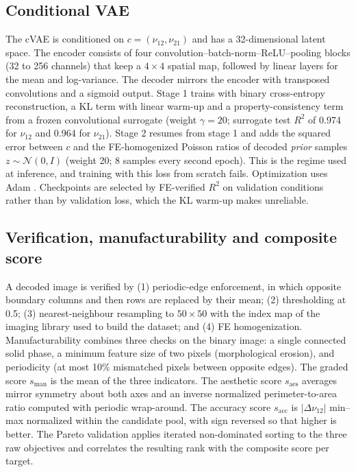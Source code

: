\documentclass[a4paper,11pt]{article}
\newcommand{\nuot}{\nu_{12}}
\newcommand{\nuto}{\nu_{21}}
\newcommand{\RR}{R^2}
\begin{document}
\subsection{Conditional VAE}
The cVAE \citep{kingma2014vae,sohn2015cvae} is conditioned on
$c=(\nuot,\nuto)$ and has a 32-dimensional latent space. The encoder
consists of four convolution--batch-norm--ReLU--pooling blocks (32 to 256
channels) that keep a $4\times4$ spatial map, followed by linear layers for
the mean and log-variance. The decoder mirrors the encoder with transposed
convolutions and a sigmoid output. Stage 1 trains with binary cross-entropy
reconstruction, a KL term with linear warm-up \citep{bowman2016generating}
and a property-consistency term from a frozen convolutional surrogate
(weight $\gamma=20$; surrogate test $\RR$ of 0.974 for $\nuot$ and 0.964 for
$\nuto$). Stage 2 resumes from stage 1 and adds the squared error between
$c$ and the FE-homogenized Poisson ratios of decoded \emph{prior} samples
$z\sim\mathcal N(0,I)$ (weight 20; 8 samples every second epoch). This is
the regime used at inference, and training with this loss from scratch
fails. Optimization uses Adam \citep{kingma2015adam}. Checkpoints are
selected by FE-verified $\RR$ on validation conditions rather than by
validation loss, which the KL warm-up makes unreliable.

\subsection{Verification, manufacturability and composite score}
A decoded image is verified by (1) periodic-edge enforcement, in which
opposite boundary columns and then rows are replaced by their mean; (2)
thresholding at 0.5; (3) nearest-neighbour resampling to $50\times50$ with the
index map of the imaging library used to build the dataset; and (4) FE
homogenization. Manufacturability combines three checks on the binary image:
a single connected solid phase, a minimum feature size of two pixels
(morphological erosion), and periodicity (at most 10\% mismatched pixels
between opposite edges). The graded score $s_{\mathrm{man}}$ is the mean of
the three indicators. The aesthetic score $s_{\mathrm{aes}}$ averages mirror
symmetry about both axes and an inverse normalized perimeter-to-area ratio
computed with periodic wrap-around. The accuracy score $s_{\mathrm{acc}}$ is
$|\Delta\nuot|$ min--max normalized within the candidate pool, with sign
reversed so that higher is better. The Pareto validation applies iterated
non-dominated sorting to the three raw objectives and correlates the
resulting rank with the composite score per target.
\end{document}

